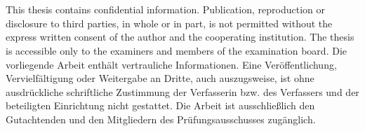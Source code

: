\chapter*{\kitWortSperrvermerk}
\thispagestyle{plain}
\ifkitEnglisch
This thesis contains confidential information. Publication, reproduction or
disclosure to third parties, in whole or in part, is not permitted without the
express written consent of the author and the cooperating institution. The
thesis is accessible only to the examiners and members of the examination board.
\else
Die vorliegende Arbeit enthält vertrauliche Informationen. Eine Veröffentlichung,
Vervielfältigung oder Weitergabe an Dritte, auch auszugsweise, ist ohne
ausdrückliche schriftliche Zustimmung der Verfasserin bzw. des Verfassers und der
beteiligten Einrichtung nicht gestattet. Die Arbeit ist ausschließlich den
Gutachtenden und den Mitgliedern des Prüfungsausschusses zugänglich.
\fi
\cleardoublepage
